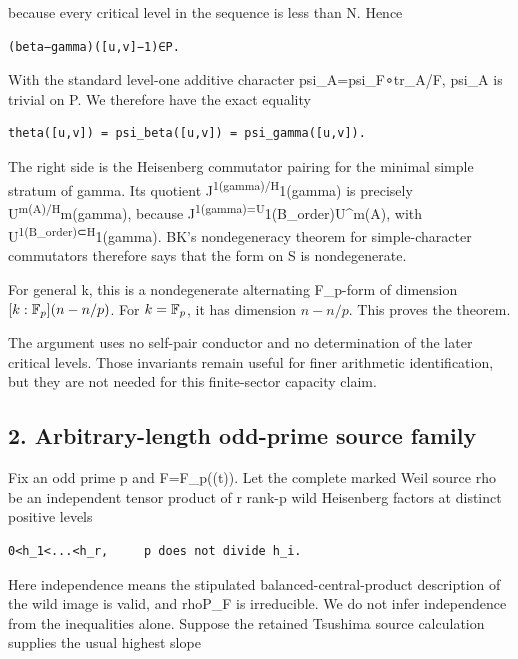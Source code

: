 because every critical level in the sequence is less than N. Hence

\begin{Verbatim}[fontsize=\small,breaklines=true,breakanywhere=true]
(beta−gamma)([u,v]−1)∈P.
\end{Verbatim}

With the standard level-one additive character psi\_A=psi\_F∘tr\_A/F,
psi\_A is trivial on P. We therefore have the exact equality

\begin{Verbatim}[fontsize=\small,breaklines=true,breakanywhere=true]
theta([u,v]) = psi_beta([u,v]) = psi_gamma([u,v]).
\end{Verbatim}

The right side is the Heisenberg commutator pairing for the minimal
simple stratum of gamma. Its quotient
J\textsuperscript{1(gamma)/H}1(gamma) is precisely
U\textsuperscript{m(A)/H}m(gamma), because
J\textsuperscript{1(gamma)=U}1(B\_order)U\^{}m(A), with
U\textsuperscript{1(B\_order)⊂H}1(gamma). BK's nondegeneracy theorem for
simple-character commutators therefore says that the form on S is
nondegenerate.

For general k, this is a nondegenerate alternating F\_p-form of
dimension \([k:\mathbb F_p](n-n/p)\). For \(k=\mathbb F_p\), it has dimension \(n-n/p\). This
proves the theorem.

The argument uses no self-pair conductor and no determination of the
later critical levels. Those invariants remain useful for finer
arithmetic identification, but they are not needed for this
finite-sector capacity claim.

\hypertarget{odd_capacity-arbitrary-length-odd-prime-source-family}{%
\subsection{2. Arbitrary-length odd-prime source
family}\label{odd_capacity-arbitrary-length-odd-prime-source-family}}

Fix an odd prime p and F=F\_p((t)). Let the complete marked Weil source
rho be an independent tensor product of r rank-p wild Heisenberg factors
at distinct positive levels

\begin{Verbatim}[fontsize=\small,breaklines=true,breakanywhere=true]
0<h_1<...<h_r,     p does not divide h_i.
\end{Verbatim}

Here independence means the stipulated balanced-central-product
description of the wild image is valid, and rho\textbar P\_F is
irreducible. We do not infer independence from the inequalities alone.
Suppose the retained Tsushima source calculation supplies the usual
highest slope

